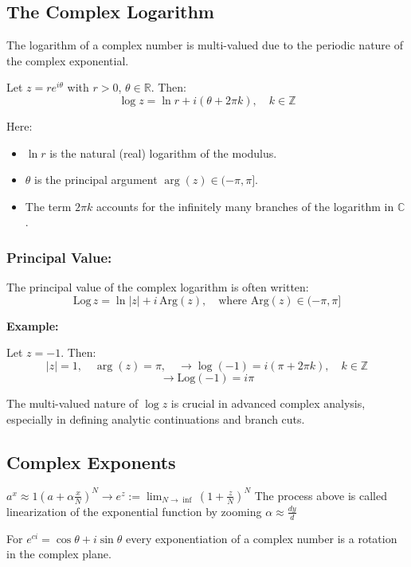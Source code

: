 \subsection{The Complex Logarithm}

The logarithm of a complex number is multi-valued due to the periodic nature of the complex exponential.

Let \( z = re^{i\theta} \) with \( r > 0 \), \( \theta \in \mathbb{R} \). Then:
\[
	\log z = \ln r + i(\theta + 2\pi k), \quad k \in \mathbb{Z}
\]

Here:
\begin{itemize}[label=\(-\)]
	\item \( \ln r \) is the natural (real) logarithm of the modulus.
	\item \( \theta \) is the principal argument \( \arg(z) \in (-\pi, \pi] \).
	\item The term \( 2\pi k \) accounts for the infinitely many branches of the logarithm in \( \mathbb{C} \).
\end{itemize}

\subsubsection*{Principal Value:}
The principal value of the complex logarithm is often written:
\[
	\mathrm{Log}\,z = \ln |z| + i\,\mathrm{Arg}(z), \quad \text{where } \mathrm{Arg}(z) \in (-\pi, \pi]
\]

\textbf{Example:}
\vspace{\baselineskip}

Let \( z = -1 \). Then:
\[
	|z| = 1, \quad \arg(z) = \pi, \quad \to \log(-1) = i(\pi + 2\pi k), \quad k \in \mathbb{Z}
\]
\[
	\to \mathrm{Log}(-1) = i\pi
\]

The multi-valued nature of \( \log z \) is crucial in advanced complex analysis, especially in defining analytic continuations and branch cuts.

\subsection{Complex Exponents}
\(a^x \approx 1 {\left(a + \alpha \frac{x}{N} \right)}^N \to e^z := \lim_{N \rightarrow \inf} {\left( 1 + \frac{z}{N}\right)}^N \)
The process above is called linearization of the exponential function by zooming  \(\alpha \approx \frac{dy}{d}\)

 For  \(e^{ci} = \cos{\theta} + i\sin{\theta}\) every exponentiation of a complex number is a rotation 
in the complex plane.

